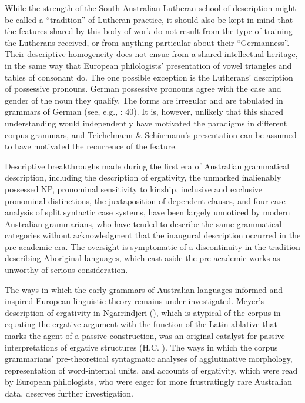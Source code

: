 While the strength of the South Australian Lutheran school of description might be called a “tradition” of Lutheran practice, it should also be kept in mind that the features shared by this body of work do not result from the type of training the Lutherans received, or from anything particular about their “Germanness''. Their descriptive homogeneity does not ensue from a shared intellectual heritage, in the same way that European philologists' presentation of vowel triangles and tables of consonant do. The one possible exception is the Lutherans' description of possessive pronouns. German possessive pronouns agree with the case and gender of the noun they qualify. The forms are irregular and are tabulated in grammars of German (see, e.g., \citealt{bauer_grundzuge_1871}: 40). It is, however, unlikely that this shared understanding would independently have motivated the paradigms in different corpus grammars, and Teichelmann \& Schürmann’s presentation can be assumed to have motivated the recurrence of the feature.

Descriptive breakthroughs made during the first era of Australian grammatical description, including the description of ergativity, the unmarked inalienably possessed NP, pronominal sensitivity to kinship, inclusive and exclusive pronominal distinctions, the juxtaposition of dependent clauses, and four case analysis of split syntactic case systems, have been largely unnoticed by modern Australian grammarians, who have tended to describe the same grammatical categories without acknowledgment that the inaugural description occurred in the pre-academic era. The oversight is symptomatic of a discontinuity in the tradition describing Aboriginal languages, which cast aside the pre-academic works as unworthy of serious consideration.

The ways in which the early grammars of Australian languages informed and inspired European linguistic theory remains under-investigated. Meyer’s description of ergativity in Ngarrindjeri (\citeyear{meyer_vocabulary_1843}), which is atypical of the corpus in equating the ergative argument with the function of the Latin ablative that marks the agent of a passive construction, was an original catalyst for passive interpretations of ergative structures (H.C. \citealt{gabelentz_uber_1861}). The ways in which the corpus grammarians' pre-theoretical syntagmatic analyses of agglutinative morphology, representation of word-internal units, and accounts of ergativity, which were read by European philologists, who were eager for more frustratingly rare Australian data, deserves further investigation.

